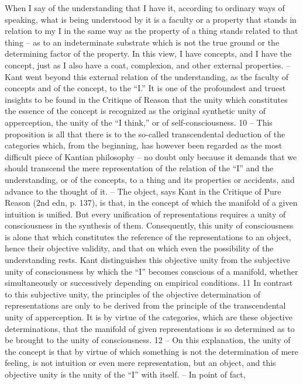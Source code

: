When I say of the understanding that I have it, according to ordinary
ways of speaking, what is being understood by it is a faculty or a property
that stands in relation to my I in the same way as the property of a thing
stands related to that thing – as to an indeterminate substrate which is not
the true ground or the determining factor of the property. In this view, I
have concepts, and I have the concept, just as I also have a coat, complexion,
and other external properties. – Kant went beyond this external relation
of the understanding, as the faculty of concepts and of the concept, to
the “I.” It is one of the profoundest and truest insights to be found in
the Critique of Reason that the unity which constitutes the essence of the
concept is recognized as the original synthetic unity of apperception, the
unity of the “I think,” or of self-consciousness. 10 – This proposition is
all that there is to the so-called transcendental deduction of the categories
which, from the beginning, has however been regarded as the most difficult
piece of Kantian philosophy – no doubt only because it demands that we
should transcend the mere representation of the relation of the “I” and the
understanding, or of the concepts, to a thing and its properties or accidents,
and advance to the thought of it. – The object, says Kant in the Critique of
Pure Reason (2nd edn, p. 137), is that, in the concept of which the manifold
of a given intuition is unified. But every unification of representations
requires a unity of consciousness in the synthesis of them. Consequently, this
unity of consciousness is alone that which constitutes the reference of the
representations to an object, hence their objective validity, and that on
which even the possibility of the understanding rests. Kant distinguishes this
objective unity from the subjective unity of consciousness by which the
“I” becomes conscious of a manifold, whether simultaneously or successively
depending on empirical conditions. 11 In contrast to this subjective unity,
the principles of the objective determination of representations are only to
be derived from the principle of the transcendental unity of apperception. It
is by virtue of the categories, which are these objective determinations, that
the manifold of given representations is so determined as to be brought
to the unity of consciousness. 12 – On this explanation, the unity of the
concept is that by virtue of which something is not the determination of
mere feeling, is not intuition or even mere representation, but an object, and
this objective unity is the unity of the “I” with itself. – In point of fact,
